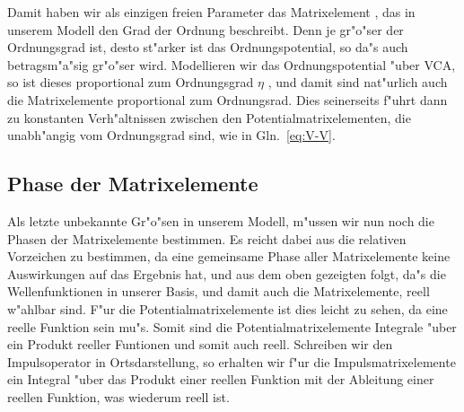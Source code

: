 Damit haben wir als einzigen freien Parameter das Matrixelement , das in
unserem Modell den Grad der Ordnung beschreibt. Denn je gr"o"ser der
Ordnungsgrad ist, desto st"arker ist das Ordnungspotential, so da"s auch
 betragsm"a"sig gr"o"ser wird. Modellieren wir das Ordnungspotential
"uber VCA, so ist dieses proportional zum Ordnungsgrad $\eta$ \cite{rats:94},
und damit sind nat"urlich auch die Matrixelemente proportional zum
Ordnungsrad. Dies seinerseits f"uhrt dann zu konstanten Verh"altnissen
zwischen den Potentialmatrixelementen, die unabh"angig vom Ordnungsgrad sind,
wie in Gln.~\eqref{eq:V-V}.


\subsection{Phase der Matrixelemente}
\label{sec:phase}

Als letzte unbekannte Gr"o"sen in unserem Modell, m"ussen wir nun noch die
Phasen der Matrixelemente bestimmen. Es reicht dabei aus die relativen
Vorzeichen zu bestimmen, da eine gemeinsame Phase aller Matrixelemente keine
Auswirkungen auf das Ergebnis hat, und aus dem oben gezeigten folgt, da"s die
Wellenfunktionen in unserer Basis, und damit auch die Matrixelemente, reell
w"ahlbar sind.  F"ur die Potentialmatrixelemente ist dies leicht zu sehen, da
 eine reelle Funktion sein mu"s. Somit sind die
Potentialmatrixelemente Integrale "uber ein Produkt reeller Funtionen und
somit auch reell. Schreiben wir den Impulsoperator in Ortsdarstellung, so
erhalten wir f"ur die Impulsmatrixelemente ein Integral "uber das Produkt
einer reellen Funktion mit der Ableitung einer reellen Funktion, was wiederum
reell ist.
%
%

